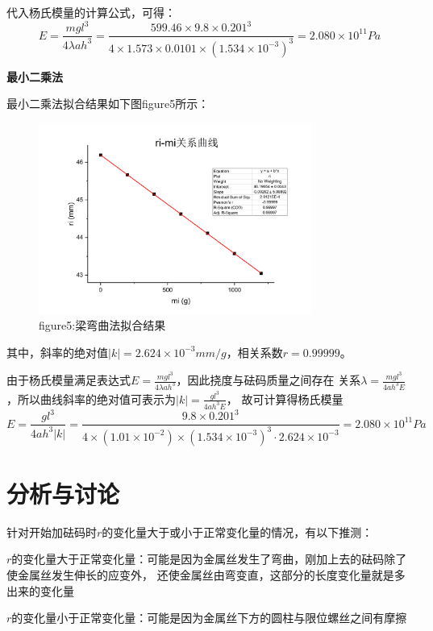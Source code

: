 \documentclass{article}
\begin{document}
    代入杨氏模量的计算公式，可得：
    $$E=\frac{mgl^3}{4\lambda ah^3}=\frac{599.46\times 9.8 \times 0.201^3}{4\times 1.573\times0.0101\times (1.534\times 10^{-3})^3}=2.080\times 10^{11} Pa$$

    \textbf{最小二乘法}
    
    最小二乘法拟合结果如下图figure5所示：

    \begin{figure}[htb]
        \centering
        \includegraphics[width=0.8\textwidth]{梁弯曲法拟合结果.jpg}        
        \caption{figure5:梁弯曲法拟合结果}
    \end{figure}

    其中，斜率的绝对值$|k|=2.624\times 10^{-3}mm/g$，相关系数$r=0.99999$。

    由于杨氏模量满足表达式$E=\frac{mgl^3}{4\lambda ah^3}$，因此挠度与砝码质量之间存在
    关系$\lambda=\frac{mgl^3}{4ah^3E}$，所以曲线斜率的绝对值可表示为$|k|=\frac{gl^3}{4ah^3E}$，
    故可计算得杨氏模量
    $$E=\frac{gl^3}{4ah^3|k|}=\frac{9.8\times 0.201^3}{4\times (1.01\times 10^{-2})\times (1.534\times 10^{-3})^3 \cdot 2.624\times 10^{-3}}=2.080\times 10^{11} Pa$$

    \section{分析与讨论}
    针对开始加砝码时$r$的变化量大于或小于正常变化量的情况，有以下推测：

    $r$的变化量大于正常变化量：可能是因为金属丝发生了弯曲，刚加上去的砝码除了使金属丝发生伸长的应变外，
    还使金属丝由弯变直，这部分的长度变化量就是多出来的变化量

    $r$的变化量小于正常变化量：可能是因为金属丝下方的圆柱与限位螺丝之间有摩擦
\end{document}
